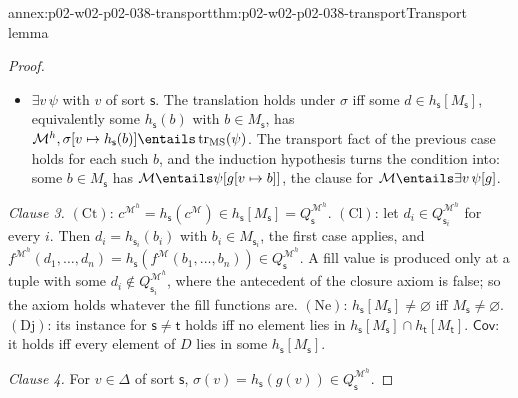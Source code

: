 \begin{annexitem}{annex:p02-w02-p02-038-transport}{thm:p02-w02-p02-038-transport}{Transport lemma}
\begin{proof}
\begin{itemize}
      \(w\in\Delta\setminus\{v\}\) of sort \(\mathsf t\) the value is
      \(\sigma(w)=h_{\mathsf t}(g(w))\).  Since
      \(\FV(\psi)\subseteq\Delta\cup\{v\}\), the induction hypothesis at that
      context gives
      \(\mathcal M^{h},\sigma[v\mapsto h_{\mathsf s}(b)]\entails
      \operatorname{tr}_{\mathrm{MS}}(\psi)\) iff
      \(\mathcal M\entails\psi[g[v\mapsto b]]\).  So the translation holds iff
      \(\mathcal M\entails\psi[g[v\mapsto b]]\) for every
      \(b\in M_{\mathsf s}\), the clause for
      \(\mathcal M\entails\forall v\,\psi[g]\).
\item \(\exists v\,\psi\) with \(v\) of sort \(\mathsf s\).  The translation
      holds under \(\sigma\) iff some \(d\in h_{\mathsf s}[M_{\mathsf s}]\),
      equivalently some \(h_{\mathsf s}(b)\) with \(b\in M_{\mathsf s}\),
      has \(\mathcal M^{h},\sigma[v\mapsto h_{\mathsf s}(b)]\entails
      \operatorname{tr}_{\mathrm{MS}}(\psi)\).  The transport fact of the
      previous case holds for each such \(b\), and the induction hypothesis
      turns the condition into: some \(b\in M_{\mathsf s}\) has
      \(\mathcal M\entails\psi[g[v\mapsto b]]\), the clause for
      \(\mathcal M\entails\exists v\,\psi[g]\).
\end{itemize}

\emph{Clause 3.}  \((\mathrm{Ct})\): \(c^{\mathcal M^{h}}=
h_{\mathsf s}(c^{\mathcal M})\in h_{\mathsf s}[M_{\mathsf s}]=
Q_{\mathsf s}^{\mathcal M^{h}}\).  \((\mathrm{Cl})\): let
\(d_i\in Q_{\mathsf s_i}^{\mathcal M^{h}}\) for every \(i\).  Then
\(d_i=h_{\mathsf s_i}(b_i)\) with \(b_i\in M_{\mathsf s_i}\), the first case
applies, and \(f^{\mathcal M^{h}}(d_1,\ldots,d_n)=
h_{\mathsf s}(f^{\mathcal M}(b_1,\ldots,b_n))\in Q_{\mathsf s}^{\mathcal M^{h}}\).
A fill value is produced only at a tuple with some
\(d_i\notin Q_{\mathsf s_i}^{\mathcal M^{h}}\), where the antecedent of the
closure axiom is false; so the axiom holds whatever the fill functions are.
\((\mathrm{Ne})\): \(h_{\mathsf s}[M_{\mathsf s}]\ne\varnothing\) iff
\(M_{\mathsf s}\ne\varnothing\).  \((\mathrm{Dj})\): its instance for
\(\mathsf s\ne\mathsf t\) holds iff no element lies in
\(h_{\mathsf s}[M_{\mathsf s}]\cap h_{\mathsf t}[M_{\mathsf t}]\).
\(\mathsf{Cov}\): it holds iff every element of \(D\) lies in some
\(h_{\mathsf s}[M_{\mathsf s}]\).

\emph{Clause 4.}  For \(v\in\Delta\) of sort \(\mathsf s\),
\(\sigma(v)=h_{\mathsf s}(g(v))\in Q_{\mathsf s}^{\mathcal M^{h}}\).


\end{proof}
\end{annexitem}

